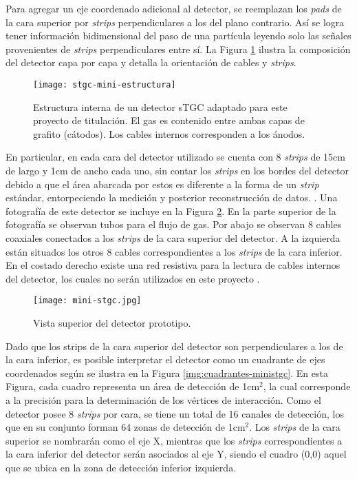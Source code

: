 	Para agregar un eje coordenado adicional al detector, se reemplazan los \textit{pads} de la cara superior por \textit{strips} perpendiculares a los del plano contrario. Así se logra tener información bidimensional del paso de una partícula leyendo solo las señales provenientes de \textit{strips} perpendiculares entre sí. La Figura \ref{img:stgc-mini-estructura} ilustra la composición del detector capa por capa y detalla la orientación de cables y \textit{strips}.
	
	\begin{figure}[h]
		\centering
		\texttt{[image: stgc-mini-estructura]}
		\caption{Estructura interna de un detector sTGC adaptado para este proyecto de titulación. El gas es contenido entre ambas capas de grafito (cátodos). Los cables internos corresponden a los ánodos.}
		\label{img:stgc-mini-estructura}
	\end{figure}

	En particular, en cada cara del detector utilizado se cuenta con 8 \textit{strips} de 15cm de largo y 1cm de ancho cada uno, sin contar los \textit{strips} en los bordes del detector debido a que el área abarcada por estos es diferente a la forma de un \textit{strip} estándar, entorpeciendo la medición y posterior reconstrucción de datos. . Una fotografía de este detector se incluye en la Figura \ref{img:foto-mini-stgc}. En la parte superior de la fotografía se observan tubos para el flujo de gas. Por abajo se observan 8 cables coaxiales conectados a los \textit{strips} de la cara superior del detector. A la izquierda están situados los otros 8 cables correspondientes a los \textit{strips} de la cara inferior. En el costado derecho existe una red resistiva para la lectura de cables internos del detector, los cuales no serán utilizados en este proyecto .
	
	\begin{figure}[h]
		\centering
		\texttt{[image: mini-stgc.jpg]}
		\caption{Vista superior del detector prototipo.}
		\label{img:foto-mini-stgc}
	\end{figure}	
	
	Dado que los strips de la cara superior del detector son perpendiculares a los de la cara inferior, es posible interpretar el detector como un cuadrante de ejes coordenados según se ilustra en la Figura \ref{img:cuadrantes-ministgc}. En esta Figura, cada cuadro representa un área de detección de 1cm$^2$, la cual corresponde a la precisión para la determinación de los vértices de interacción. Como el detector posee 8 \textit{strips} por cara, se tiene un total de 16 canales de detección, los que en su conjunto forman 64 zonas de detección de 1cm$^2$. Los \textit{strips} de la cara superior se nombrarán como el eje X, mientras que los \textit{strips} correspondientes a la cara inferior del detector serán asociados al eje Y, siendo el cuadro (0,0) aquel que se ubica en la zona de detección inferior izquierda.
	
